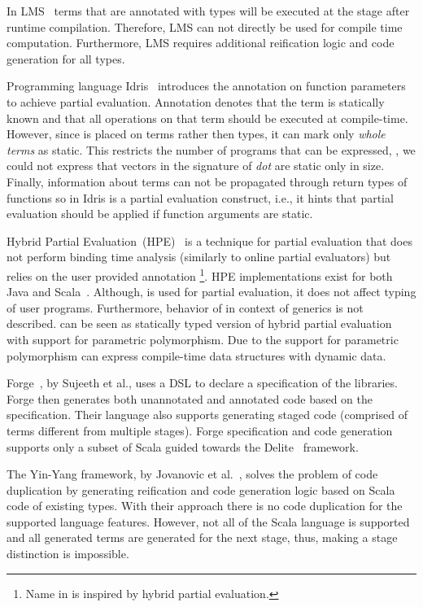In LMS~\cite{rompf2012lightweight} terms that are annotated with  types will be executed at
 the stage after runtime compilation. Therefore, LMS can not directly be used for compile time computation. Furthermore,
 LMS requires additional reification logic and code generation for all  types.

 Programming language Idris~\cite{brady2010scrapping} introduces the  annotation
  on function parameters to achieve partial evaluation. Annotation  denotes
  that the term is statically known and that all operations on that term should
  be executed at compile-time. However, since  is placed on terms rather
  then types, it can mark only \emph{whole terms} as static. This restricts the number
  of programs that can be expressed, \eg, we could not express that vectors in the
  signature of \emph{dot} are static only in size. Finally, information about 
  terms can not be propagated through return types of functions so 
  in Idris is a partial evaluation construct, i.e., it hints that partial evaluation
  should be applied if function arguments are static.


Hybrid Partial Evaluation~(HPE)~\cite{shali2011Hybrid} is a technique for partial evaluation that
 does not perform binding time analysis (similarly to online partial evaluators) but relies on the user
 provided annotation \footnote{Name  in \ct is inspired by hybrid partial evaluation.}.
 HPE implementations exist for both Java and Scala~\cite{sherwany2015refactoring}.
 Although,  is used for partial evaluation, it does not affect typing of user programs. Furthermore,
 behavior of  in context of generics is not described. \ct can be seen
 as statically typed version of hybrid partial evaluation with support for parametric polymorphism.
 Due to the support for parametric polymorphism \ct can express compile-time data structures with
 dynamic data.

Forge~\cite{forge}, by Sujeeth et al., uses a DSL to declare a specification of the libraries.
 Forge then generates both unannotated and annotated code based on the specification.
 Their language also supports generating staged code (comprised of terms different from multiple stages).
 Forge specification and code generation supports only a subset of Scala guided towards the
 Delite~\cite{brown_heterogeneous_2011,composition-ecoop2013} framework.

The Yin-Yang framework, by Jovanovic et al.~\cite{yin-yang}, solves the problem
 of code duplication by generating reification and code generation logic based on Scala code of existing types.
 With their approach there is no code duplication for the supported language features. However, not all of the
 Scala language is supported and all generated terms are generated for the next stage, thus,
 making a stage distinction is impossible.
